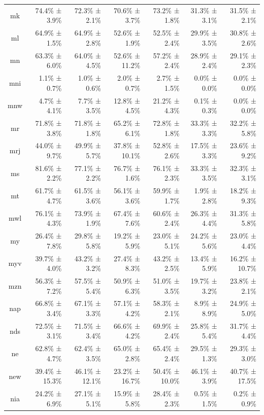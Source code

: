 \documentclass[10pt, a4paper]{article}
\begin{document}
\begin{table}[h]
\begin{tabular}{crrrrrr}
mk & 74.4\% ± 3.9\% & 72.3\% ± 2.1\% & 70.6\% ± 3.7\% & 73.2\% ± 1.8\% & 31.3\% ± 3.1\% & 31.5\% ± 2.1\% \\
ml & 64.9\% ± 1.5\% & 64.9\% ± 2.8\% & 52.6\% ± 1.9\% & 52.5\% ± 2.4\% & 29.9\% ± 3.5\% & 30.8\% ± 2.6\% \\
mn & 63.3\% ± 6.0\% & 64.0\% ± 4.5\% & 52.6\% ± 11.2\% & 57.2\% ± 2.4\% & 28.9\% ± 2.4\% & 29.1\% ± 2.3\% \\
mni & 1.1\% ± 0.7\% & 1.0\% ± 0.6\% & 2.0\% ± 0.7\% & 2.7\% ± 1.5\% & 0.0\% ± 0.0\% & 0.0\% ± 0.0\% \\
mnw & 4.7\% ± 4.1\% & 7.7\% ± 3.5\% & 12.8\% ± 4.5\% & 21.2\% ± 4.3\% & 0.1\% ± 0.3\% & 0.0\% ± 0.0\% \\
mr & 71.8\% ± 3.8\% & 71.8\% ± 1.8\% & 65.2\% ± 6.1\% & 72.8\% ± 1.8\% & 33.3\% ± 3.3\% & 32.2\% ± 5.8\% \\
mrj & 44.0\% ± 9.7\% & 49.9\% ± 5.7\% & 37.8\% ± 10.1\% & 52.8\% ± 2.6\% & 17.5\% ± 3.3\% & 23.6\% ± 9.2\% \\
ms & 81.6\% ± 2.2\% & 77.1\% ± 2.2\% & 76.7\% ± 1.6\% & 76.1\% ± 2.3\% & 33.3\% ± 3.5\% & 32.3\% ± 3.1\% \\
mt & 61.7\% ± 4.7\% & 61.5\% ± 3.6\% & 56.1\% ± 3.6\% & 59.9\% ± 1.7\% & 1.9\% ± 2.8\% & 18.2\% ± 9.3\% \\
mwl & 76.1\% ± 4.3\% & 73.9\% ± 1.9\% & 67.4\% ± 7.6\% & 60.6\% ± 2.4\% & 26.3\% ± 4.4\% & 31.3\% ± 5.8\% \\
my & 26.4\% ± 7.8\% & 29.8\% ± 5.8\% & 19.2\% ± 5.9\% & 23.0\% ± 5.1\% & 24.2\% ± 5.6\% & 23.0\% ± 4.4\% \\
myv & 39.7\% ± 4.0\% & 43.2\% ± 3.2\% & 27.4\% ± 8.3\% & 43.2\% ± 2.5\% & 13.4\% ± 5.9\% & 16.2\% ± 10.7\% \\
mzn & 56.3\% ± 7.2\% & 57.5\% ± 5.4\% & 50.9\% ± 6.3\% & 51.0\% ± 3.5\% & 19.7\% ± 3.2\% & 23.8\% ± 2.1\% \\
nap & 66.8\% ± 3.4\% & 67.1\% ± 3.3\% & 57.1\% ± 4.2\% & 58.3\% ± 2.1\% & 8.9\% ± 8.9\% & 24.9\% ± 5.0\% \\
nds & 72.5\% ± 3.1\% & 71.5\% ± 3.4\% & 66.6\% ± 4.2\% & 69.9\% ± 2.4\% & 25.8\% ± 5.4\% & 31.7\% ± 4.4\% \\
ne & 62.8\% ± 4.7\% & 62.4\% ± 3.5\% & 65.0\% ± 2.8\% & 65.4\% ± 2.4\% & 29.5\% ± 1.3\% & 29.3\% ± 3.0\% \\
new & 39.4\% ± 15.3\% & 46.1\% ± 12.1\% & 23.2\% ± 16.7\% & 50.4\% ± 10.0\% & 46.1\% ± 3.9\% & 40.7\% ± 17.5\% \\
nia & 24.2\% ± 6.9\% & 27.1\% ± 5.1\% & 15.9\% ± 5.8\% & 28.4\% ± 2.3\% & 0.5\% ± 1.5\% & 0.2\% ± 0.9\% \\

\end{tabular}
\end{table}
\end{document}
